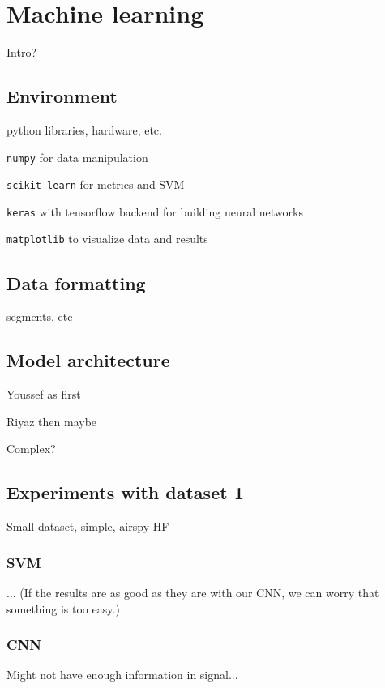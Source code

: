 \section{Machine learning}

Intro?

\subsection{Environment}

python libraries, hardware, etc.

\texttt{numpy} for data manipulation

\texttt{scikit-learn} for metrics and SVM

\texttt{keras} with tensorflow backend for building neural networks

\texttt{matplotlib} to visualize data and results

\subsection{Data formatting}

segments, etc

\subsection{Model architecture}

Youssef as first

Riyaz then maybe

Complex?

\subsection{Experiments with dataset 1}

Small dataset, simple, airspy HF+

\subsubsection{SVM}

... (If the results are as good as they are with our CNN, we can worry that something is too easy.)

\subsubsection{CNN}

Might not have enough information in signal...
